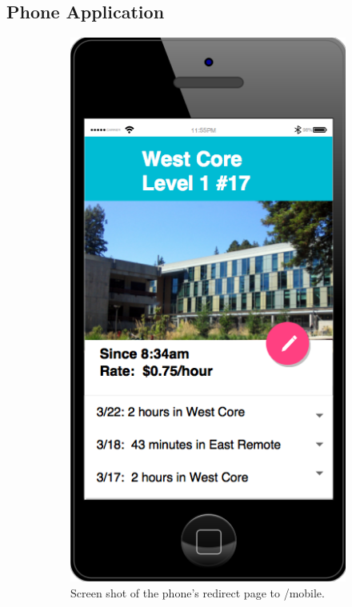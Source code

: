 \subsection{Phone Application}
\begin{figure}
\centering
\begin{subfigure}{.4\textwidth}
  \centering
  \includegraphics[width=.55\linewidth]{pictures/phone.png}
  \caption{Screen shot of the phone's redirect page to /mobile.}
\end{subfigure}%
\hspace{1cm}
\begin{subfigure}{.4\textwidth}
  \centering

\end{subfigure}
\end{figure}
